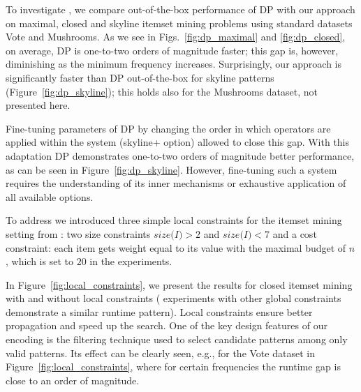 To investigate \qtwo, we compare out-of-the-box performance of DP \parencite{dp2013} with our approach on maximal, closed and skyline itemset mining problems using standard datasets Vote and Mushrooms. As we see in Figs.~\ref{fig:dp_maximal} and \ref{fig:dp_closed}, on average, DP is one-to-two orders of magnitude faster; this gap is, however, diminishing as the minimum frequency increases. %
Surprisingly, our approach is significantly faster than DP out-of-the-box for skyline patterns (Figure~\ref{fig:dp_skyline}); this holds also for the Mushrooms dataset, not presented here. 

Fine-tuning parameters of DP by changing the order in which operators are applied within the system (skyline+ option) allowed to close this gap. With this adaptation DP demonstrates one-to-two orders of magnitude better performance, as can be seen in Figure~\ref{fig:dp_skyline}. However, fine-tuning such a system requires the understanding of its inner mechanisms or exhaustive application of all available options. 

To %
address \qthree we introduced three simple local constraints %
for the itemset mining setting from \qtwo: %
two size constraints $\textit{size(I)} > 2$ and $\textit{size(I)} < 7$ and a cost constraint: each item gets weight equal to its value with the maximal budget of $n$, which is set to $20$ in the experiments. %

In Figure~\ref{fig:local_constraints}, we present the results for closed itemset mining with and without local constraints (%
experiments with other global constraints demonstrate a similar runtime pattern). %
Local constraints ensure %
better propagation and speed up the search. One of the key design features of our encoding is the filtering technique used to select candidate patterns among only valid patterns. Its effect can be clearly seen, e.g., for the Vote dataset in Figure~\ref{fig:local_constraints}, where for certain frequencies the runtime gap is close to an order of magnitude.

